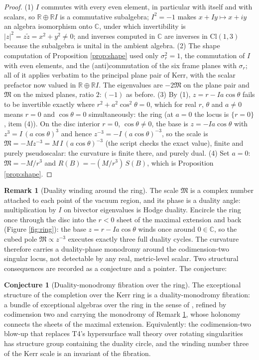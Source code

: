 \documentclass[11pt]{article}
\theoremstyle{definition}
\newtheorem{remark}[theorem]{Remark}
\newtheorem{conjecture}[theorem]{Conjecture}
\newcommand{\Cl}{\mathrm{Cl}}
\newcommand{\R}{\mathbb{R}}
\newcommand{\C}{\mathbb{C}}
\begin{document}
\begin{proof}
(1) $I$ commutes with every even element, in particular with itself and with scalars, so $\R \oplus \R I$ is a commutative subalgebra; $I^2 = -1$ makes $x + Iy \mapsto x + iy$ an algebra isomorphism onto $\C$, under which invertibility is $|z|^2 = z\tilde z = x^2 + y^2 \neq 0$; and inverses computed in $\C$ are inverses in $\Cl(1,3)$ because the subalgebra is unital in the ambient algebra. (2) The shape computation of Proposition \ref{prop:shape} used only $\sigma_r^2 = 1$, the commutation of $I$ with even elements, and the (anti)commutation of the six frame planes with $\sigma_r$; all of it applies verbatim to the principal plane pair of Kerr, with the scalar prefactor now valued in $\R \oplus \R I$. The eigenvalues are $-2\mathfrak M$ on the plane pair and $\mathfrak M$ on the mixed planes, ratio $2 : (-1)$ as before. (3) By (1), $z = r - Ia\cos\theta$ fails to be invertible exactly where $r^2 + a^2\cos^2\theta = 0$, which for real $r$, $\theta$ and $a \neq 0$ means $r = 0$ and $\cos\theta = 0$ simultaneously: the ring (at $a = 0$ the locus is $\{r = 0\}$, item (4)). On the disc interior $r = 0$, $\cos\theta \neq 0$, the base is $z = -Ia\cos\theta$ with $z^3 = I\,(a\cos\theta)^3$ and hence $z^{-3} = -I\,(a\cos\theta)^{-3}$, so the scale is $\mathfrak M = -M z^{-3} = M\,I\,(a\cos\theta)^{-3}$ (the script checks the exact value), finite and purely pseudoscalar: the curvature is finite there, and purely dual. (4) Set $a = 0$: $\mathfrak M = -M/r^3$ and $R(B) = -(M/r^3)\,S(B)$, which is Proposition \ref{prop:shape}.
\end{proof}

\begin{remark}[Duality winding around the ring]\label{rem:winding}
The scale $\mathfrak M$ is a complex number attached to each point of the vacuum region, and its phase is a duality angle: multiplication by $I$ on bivector eigenvalues is Hodge duality. Encircle the ring once through the disc into the $r < 0$ sheet of the maximal extension and back (Figure \ref{fig:ring}): the base $z = r - Ia\cos\theta$ winds once around $0 \in \C$, so the cubed pole $\mathfrak M \propto z^{-3}$ executes exactly three full duality cycles. The curvature therefore carries a duality-phase monodromy around the codimension-two singular locus, not detectable by any real, metric-level scalar. Two structural consequences are recorded as a conjecture and a pointer. The conjecture:
\end{remark}

\begin{conjecture}[Duality-monodromy fibration over the ring]\label{conj:monodromy}
The exceptional structure of the completion over the Kerr ring is a duality-monodromy fibration: a bundle of exceptional algebras over the ring in the sense of \cite[Prop.~6.1]{ButlerT4}, refined by codimension two and carrying the monodromy of Remark \ref{rem:winding}, whose holonomy connects the sheets of the maximal extension. Equivalently: the codimension-two blow-up that replaces T4's hypersurface wall theory over rotating singularities has structure group containing the duality circle, and the winding number three of the Kerr scale is an invariant of the fibration.
\end{conjecture}
\end{document}
